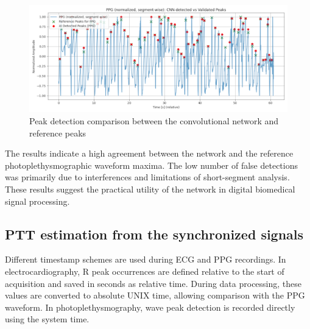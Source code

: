 \documentclass{citask}
\begin{document}
\begin{figure}[htbp]
    \centering
    \includegraphics[scale=0.28]{images/ppg_ai_vs_real.png}
    \caption{Peak detection comparison between the convolutional network and reference peaks}
    \label{fig:ppg_ai_real_peaks}
\end{figure}

The results indicate a high agreement between the network and the reference photoplethysmographic waveform maxima. The low number of false detections was primarily due to interferences and limitations of short-segment analysis. These results suggest the practical utility of the network in digital biomedical signal processing.


\subsection{PTT estimation from the synchronized signals}
Different timestamp schemes are used during ECG and PPG recordings. In electrocardiography, R peak occurrences are defined relative to the start of acquisition and saved in seconds as relative time. During data processing, these values are converted to absolute UNIX time, allowing comparison with the PPG waveform. In photoplethysmography, wave peak detection is recorded directly using the system time.
\end{document}

